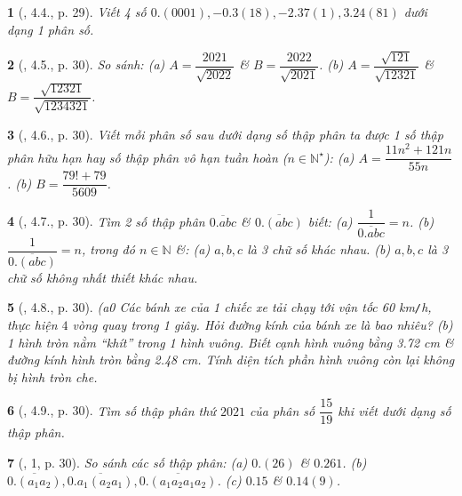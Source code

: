 \documentclass{article}
\newtheorem{baitoan}{}
\begin{document}
\begin{baitoan}[\cite{Binh_boi_duong_Toan_7_tap_1}, 4.4., p. 29]
	Viết 4 số $0.(0001),-0.3(18),-2.37(1),3.24(81)$ dưới dạng 1 phân số.
\end{baitoan}

\begin{baitoan}[\cite{Binh_boi_duong_Toan_7_tap_1}, 4.5., p. 30]
	So sánh: (a) $A = \dfrac{2021}{\sqrt{2022}}$ \& $B = \dfrac{2022}{\sqrt{2021}}$. (b) $A = \dfrac{\sqrt{121}}{\sqrt{12321}}$ \& $B = \dfrac{\sqrt{12321}}{\sqrt{1234321}}$.
\end{baitoan}

\begin{baitoan}[\cite{Binh_boi_duong_Toan_7_tap_1}, 4.6., p. 30]
	Viết mỗi phân số sau dưới dạng số thập phân ta được 1 số thập phân hữu hạn hay số thập phân vô hạn tuần hoàn ($n\in\mathbb{N}^\star$): (a) $A = \dfrac{11n^2 + 121n}{55n}$. (b) $B = \dfrac{79! + 79}{5609}$.
\end{baitoan}

\begin{baitoan}[\cite{Binh_boi_duong_Toan_7_tap_1}, 4.7., p. 30]
	Tìm 2 số thập phân $\overline{0.abc}$ \& $\overline{0.(abc)}$ biết: (a) $\dfrac{1}{\overline{0.abc}} = n$. (b) $\dfrac{1}{\overline{0.(abc)}} = n$, trong đó $n\in\mathbb{N}$ \&: (a) $a,b,c$ là 3 chữ số khác nhau. (b) $a,b,c$ là 3 chữ số không nhất thiết khác nhau.
\end{baitoan}

\begin{baitoan}[\cite{Binh_boi_duong_Toan_7_tap_1}, 4.8., p. 30]
	(a0 Các bánh xe của 1 chiếc xe tải chạy tới vận tốc {\rm60 km{\tt/}h}, thực hiện $4$ vòng quay trong 1 giây. Hỏi đường kính của bánh xe là bao nhiêu? (b) 1 hình tròn nằm ``khít'' trong 1 hình vuông. Biết cạnh hình vuông bằng {\rm3.72 cm} \& đường kính hình tròn bằng {\rm2.48 cm}. Tính diện tích phần hình vuông còn lại không bị hình tròn che.
\end{baitoan}

\begin{baitoan}[\cite{Binh_boi_duong_Toan_7_tap_1}, 4.9., p. 30]
	Tìm số thập phân thứ $2021$ của phân số $\dfrac{15}{19}$ khi viết dưới dạng số thập phân.
\end{baitoan}

\begin{baitoan}[\cite{Binh_boi_duong_Toan_7_tap_1}, 1, p. 30]
	So sánh các số thập phân: (a) $0.(26)$ \& $0.261$. (b) $\overline{0.(a_1a_2)},\overline{0.a_1(a_2a_1)},\overline{0.(a_1a_2a_1a_2)}$. (c) $0.15$ \& $0.14(9)$.
\end{baitoan}
\end{document}

